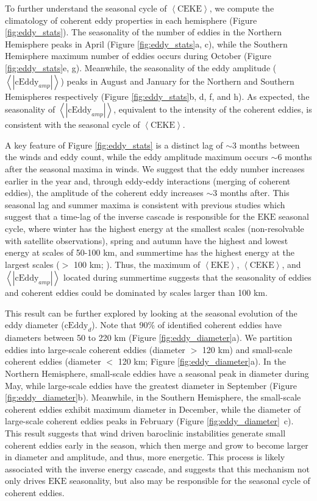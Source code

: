 \documentclass[draft,linenumbers]{agujournal2019}
\newcommand{\EKE}{\textrm{EKE}}
\newcommand{\CEKE}{\textrm{CEKE}}
\newcommand{\cEddy}{\textrm{cEddy}}
\begin{document}
	To further understand the seasonal cycle of $\left<\CEKE\right>$, we compute the climatology of coherent eddy properties in each hemisphere (Figure \ref{fig:eddy_stats}). 
	The seasonality of the number of eddies in the Northern Hemisphere peaks in April (Figure \ref{fig:eddy_stats}a, c), while the Southern Hemisphere maximum number of eddies occurs during October (Figure \ref{fig:eddy_stats}e, g). 
	Meanwhile, the seasonality of the eddy amplitude ($\left<|\cEddy_{amp}|\right>$) peaks in August and January for the Northern and Southern Hemispheres respectively (Figure \ref{fig:eddy_stats}b, d, f, and h). 
	As expected, the seasonality of $\left<|\cEddy_{amp}|\right>$, equivalent to the intensity of the coherent eddies, is consistent with the seasonal cycle of $\left<\CEKE\right>$.

	A key feature of Figure \ref{fig:eddy_stats} is a distinct lag of $\sim$3 months between the winds and eddy count, while the eddy amplitude maximum occurs $\sim$6 months after the seasonal maxima in winds. 
	We suggest that the eddy number increases earlier in the year and, through eddy-eddy interactions (merging of coherent eddies), the amplitude of the coherent eddy increases $\sim$3 months after. This seasonal lag and summer maxima is consistent with previous studies which suggest that a time-lag of the inverse cascade \citep{Sasaki_seasonal_2014, Qiu_seasonal_2014} is responsible for the $\EKE$ seasonal cycle, where winter has the highest energy at the smallest scales (non-resolvable with satellite observations), spring and autumn have the highest and lowest energy at scales of 50-100 km, and summertime has the highest energy at the largest scales ($>$ 100 km; \citealt{Uchida_Seasonality_2017}). 
	Thus, the maximum of $\left<\EKE\right>$, $\left<\CEKE\right>$, and $\left<|\cEddy_{amp}|\right>$ located during summertime suggests that the seasonality of eddies and coherent eddies could be dominated by scales larger than 100 km.

	This result can be further explored by looking at the seasonal evolution of the eddy diameter ($\cEddy_d$). 
	Note that 90\% of identified coherent eddies have diameters between 50 to 220 km (Figure \ref{fig:eddy_diameter}a). We partition eddies into large-scale coherent eddies (diameter $>$ 120 km) and  small-scale coherent eddies (diameter $<$ 120 km; Figure \ref{fig:eddy_diameter}a). 
	In the Northern Hemisphere, small-scale eddies have a seasonal peak in diameter during May, while large-scale eddies have the greatest diameter in September (Figure \ref{fig:eddy_diameter}b).
	Meanwhile, in the Southern Hemisphere, the small-scale coherent eddies exhibit maximum diameter in December, while the diameter of large-scale coherent eddies peaks in February (Figure \ref{fig:eddy_diameter}~c). 
	This result suggests that wind driven baroclinic instabilities generate small coherent eddies early in the season, which then merge and grow to become larger in diameter and amplitude, and thus, more energetic. 
	This process is likely associated with the inverse energy cascade, and suggests that this mechanism not only drives $\EKE$ seasonality, but also may be responsible for the seasonal cycle of coherent eddies. 
\end{document}
